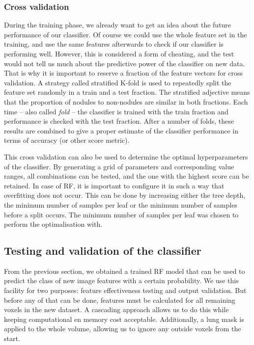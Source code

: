 \subsubsection{Cross validation}
During the training phase, we already want to get an idea about the future
performance of our classifier. Of course we could use the whole feature set in
the training, and use the same features afterwards to check if our classifier is
performing well. However, this is considered a form of cheating, and the test
would not tell us much about the predictive power of the classifier on new data.
That is why it is important to reserve a fraction of the feature vectors for
cross validation. A strategy called stratified K-fold is used to repeatedly
split the feature set randomly in a train and a test fraction.
The stratified adjective means that the proportion of nodules to non-nodules are
similar in both fractions. Each time -- also called \textit{fold} -- the
classifier is trained with the train fraction and performance is checked with
the test fraction. After a number of folds, these results are combined to give a
proper estimate of the classifier performance in terms of accuracy (or other
score metric).

This cross validation can also be used to determine the optimal hyperparameters
of the classifier. By generating a grid of parameters and corresponding value
ranges, all combinations can be tested, and the one with the highest score can
be retained. In case of RF, it is important to configure it in such a way that
overfitting does not occur. This can be done by increasing either the tree
depth, the minimum number of samples per leaf or the minimum number of samples
before a split occurs. The minimum number of samples per leaf was chosen to
perform the optimalisation with.

\subsection{Testing and validation of the classifier}
From the previous section, we obtained a trained RF model that can be used to
predict the class of new image features with a certain probability. We use this
facility for two purposes: feature effectiveness testing and output validation.
But before any of that can be done, features must be calculated for all
remaining voxels in the new dataset. A cascading approach allows us to do this
while keeping computational en memory cost acceptable. Additionally, a lung mask
is applied to the whole volume, allowing us to ignore any outside voxels from
the start.

